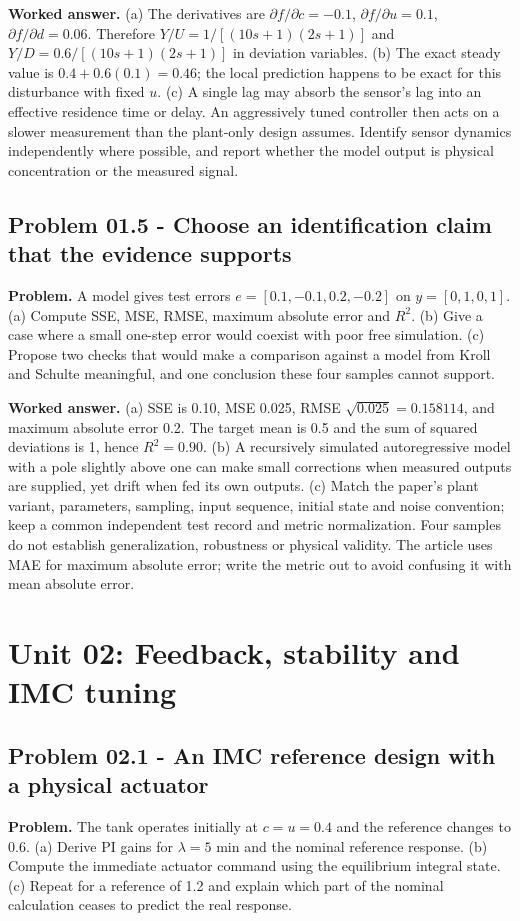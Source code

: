 \documentclass[11pt,a4paper]{article}
\begin{document}
\textbf{Worked answer.} (a) The derivatives are $\partial f/\partial c=-0.1$, $\partial f/\partial u=0.1$, $\partial f/\partial d=0.06$. Therefore $Y/U=1/[(10s+1)(2s+1)]$ and $Y/D=0.6/[(10s+1)(2s+1)]$ in deviation variables. (b) The exact steady value is $0.4+0.6(0.1)=0.46$; the local prediction happens to be exact for this disturbance with fixed $u$. (c) A single lag may absorb the sensor's lag into an effective residence time or delay. An aggressively tuned controller then acts on a slower measurement than the plant-only design assumes. Identify sensor dynamics independently where possible, and report whether the model output is physical concentration or the measured signal.

\subsection{Problem 01.5 - Choose an identification claim that the evidence supports}
\textbf{Problem.} A model gives test errors $e=[0.1,-0.1,0.2,-0.2]$ on $y=[0,1,0,1]$. (a) Compute SSE, MSE, RMSE, maximum absolute error and $R^2$. (b) Give a case where a small one-step error would coexist with poor free simulation. (c) Propose two checks that would make a comparison against a model from Kroll and Schulte meaningful, and one conclusion these four samples cannot support.


\textbf{Worked answer.} (a) SSE is 0.10, MSE 0.025, RMSE $\sqrt{0.025}=0.158114$, and maximum absolute error 0.2. The target mean is 0.5 and the sum of squared deviations is 1, hence $R^2=0.90$. (b) A recursively simulated autoregressive model with a pole slightly above one can make small corrections when measured outputs are supplied, yet drift when fed its own outputs. (c) Match the paper's plant variant, parameters, sampling, input sequence, initial state and noise convention; keep a common independent test record and metric normalization. Four samples do not establish generalization, robustness or physical validity. The article uses MAE for maximum absolute error; write the metric out to avoid confusing it with mean absolute error.


\clearpage\section{Unit 02: Feedback, stability and IMC tuning}
\subsection{Problem 02.1 - An IMC reference design with a physical actuator}
\textbf{Problem.} The tank operates initially at $c=u=0.4$ and the reference changes to 0.6. (a) Derive PI gains for $\lambda=5$ min and the nominal reference response. (b) Compute the immediate actuator command using the equilibrium integral state. (c) Repeat for a reference of 1.2 and explain which part of the nominal calculation ceases to predict the real response.
\end{document}
